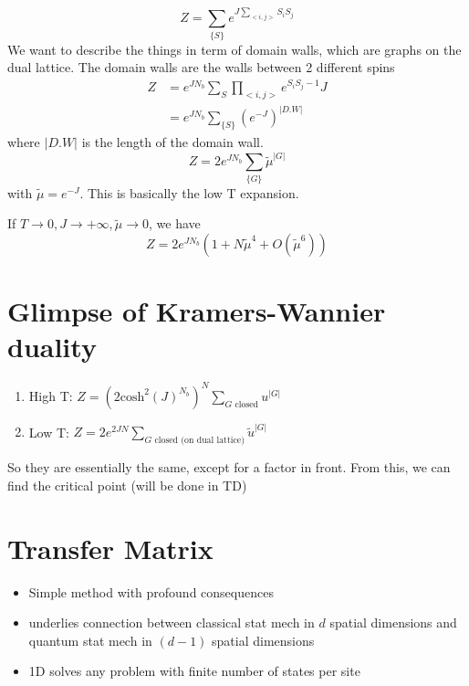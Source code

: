 \documentclass[a4paper]{book}
\theoremstyle{definition}
\theoremstyle{remark}
\begin{document}
\begin{equation}
    Z = \sum_{\{S\}} e^{J\sum_{<i,j>} S_iS_j}
\end{equation}
We want to describe the things in term of domain walls, which are graphs on the dual lattice. The domain walls are the walls between 2 different spins 
\begin{equation}
    \begin{aligned}
        Z &= e^{JN_b}\sum_S \prod_{<i,j>} e^{S_iS_j - 1}J \\
        &= e^{JN_b} \sum_{\{S\}}(e^{-J})^{|D.W|}
    \end{aligned}
\end{equation}
where $|D.W|$ is the length of the domain wall. 
\begin{equation}
    Z = 2e^{JN_b} \sum_{\{G\}}\tilde{\mu}^{|G|}
\end{equation}
with $\tilde{\mu} = e^{-J}$. This is basically the low T expansion. \par \medskip 

If $T\rightarrow 0, J \rightarrow +\infty, \tilde{\mu} \rightarrow 0$, we have 
\begin{equation}
    Z = 2e^{JN_b} (1 + N\tilde{\mu}^4 + O(\tilde{\mu}^6))
\end{equation}

\section{Glimpse of Kramers-Wannier duality}
\begin{enumerate}
    \item High T: $Z = (2\text{cosh}^2(J)^{N_b})^N \sum_{G\text{ closed}} u^{|G|}$
    \item Low T: $Z = 2e^{2JN} \sum_{G\text{ closed (on dual lattice)}} \tilde{u}^{|G|}$
\end{enumerate}
So they are essentially the same, except for a factor in front. From this, we can find the critical point (will be done in TD)


\section{Transfer Matrix}

\begin{itemize}
    \item Simple method with profound consequences 
    \item underlies connection between classical stat mech in $d$ spatial dimensions and quantum stat mech in $(d-1)$ spatial dimensions
    \item 1D solves any problem with finite number of states per site 
\end{itemize}
\end{document}
